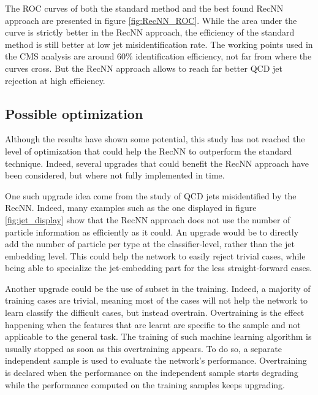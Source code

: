 The ROC curves of both the standard method and the best found RecNN approach are presented in figure \ref{fig:RecNN_ROC}. While the area under the curve is strictly better in the RecNN approach, the efficiency of the standard method is still better at low jet misidentification rate. The working points used in the CMS analysis are around 60$\%$ identification efficiency, not far from where the curves cross. But the RecNN approach allows to reach far better QCD jet rejection at high \tauh efficiency.

\subsection{Possible optimization}

Although the results have shown some potential, this study has not reached the level of optimization that could help the RecNN to outperform the standard technique. Indeed, several upgrades that could benefit the RecNN approach have been considered, but where not fully implemented in time. 

One such upgrade idea come from the study of QCD jets misidentified by the RecNN. Indeed, many examples such as the one displayed in figure \ref{fig:jet_display} show that the RecNN approach does not use the number of particle information as efficiently as it could. An upgrade would be to directly add the number of particle per type at the classifier-level, rather than the jet embedding level. This could help the network to easily reject trivial cases, while being able to specialize the jet-embedding part for the less straight-forward cases.

Another upgrade could be the use of subset in the training. Indeed, a majority of training cases are trivial, meaning most of the cases will not help the network to learn classify the difficult cases, but instead overtrain. Overtraining is the effect happening when the features that are learnt are specific to the sample and not applicable to the general task. The training of such machine learning algorithm is usually stopped as soon as this overtraining appears. To do so, a separate independent sample is used to evaluate the network's performance. Overtraining is declared when the performance on the independent sample starts degrading while the performance computed on the training samples keeps upgrading.

